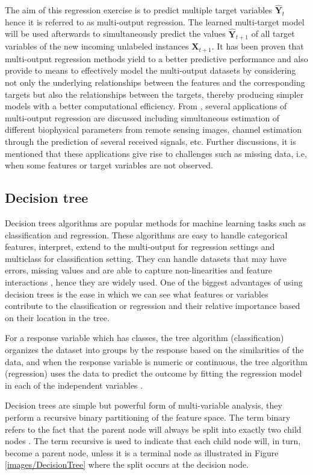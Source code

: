 The aim of this regression exercise is to predict multiple target variables $\widehat{\textbf{Y}}_{t}$  hence it is referred to as multi-output regression. The learned multi-target model will be used afterwards to simultaneously predict the values $\widehat{\textbf{Y}}_{t+1}$  of all target variables of the new incoming unlabeled instances $\textbf{X}_{t+1}$. It has been proven that multi-output regression methods yield to a better predictive performance and also provide to means to effectively
model the multi-output datasets by considering not only the underlying relationships
between the features and the corresponding targets but also the relationships between
the targets, thereby producing simpler models with a better computational efficiency. From \citep{borchani2015survey}, several applications of multi-output regression are discussed including simultaneous estimation of different biophysical parameters from remote sensing images, channel estimation through the prediction of several received signals, etc. Further discussions, it is mentioned that these applications give rise to challenges such as missing data, i.e, when some features or target variables are not observed.

\subsection{Decision tree}
\label{Dt}
Decision trees algorithms are popular methods for machine learning tasks such as classification and regression. These algorithms are easy to handle categorical features, interpret, extend to the multi-output for regression settings and multiclass for classification setting. They can handle datasets that may have errors, missing values and are able to capture non-linearities and feature interactions \citep{DT}, hence they are widely used. One of the biggest advantages of using decision trees is the ease in which we can see what features or variables contribute to the classification or regression and their relative importance based on their location in the tree.

For a response variable which
has classes, the tree algorithm (classification) organizes the dataset into groups by the response based on the similarities of the data, and when the response variable is numeric or continuous, the tree algorithm (regression) uses the data to predict the outcome by fitting the regression model in each of the independent variables \citep{morgan2014classification}.

Decision trees are simple but powerful form of multi-variable analysis, they  perform a recursive binary partitioning of the feature space. The term binary refers to the fact that the parent node  will always be split into exactly two child nodes \citep{moisen2008classification}. The term recursive is used to indicate that each child node will, in turn, become a parent node, unless it is a terminal node as illustrated in Figure \ref{images/DecisionTree} where the split occurs at the decision node.  

